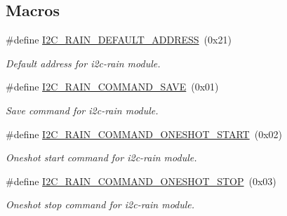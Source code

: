 \subsection*{Macros}
\begin{DoxyCompactItemize}
\item 
\mbox{\label{registers-rain_8h_a2aebb0ca4cdf424c57dee6f591c40e0c}} 
\#define \hyperlink{registers-rain_8h_a2aebb0ca4cdf424c57dee6f591c40e0c}{I2\+C\+\_\+\+R\+A\+I\+N\+\_\+\+D\+E\+F\+A\+U\+L\+T\+\_\+\+A\+D\+D\+R\+E\+SS}~(0x21)
\begin{DoxyCompactList}\small\item\em Default address for i2c-\/rain module. \end{DoxyCompactList}\item 
\mbox{\label{registers-rain_8h_a2317a1a8ab54f27bf55a2ddbbadeff89}} 
\#define \hyperlink{registers-rain_8h_a2317a1a8ab54f27bf55a2ddbbadeff89}{I2\+C\+\_\+\+R\+A\+I\+N\+\_\+\+C\+O\+M\+M\+A\+N\+D\+\_\+\+S\+A\+VE}~(0x01)
\begin{DoxyCompactList}\small\item\em Save command for i2c-\/rain module. \end{DoxyCompactList}\item 
\mbox{\label{registers-rain_8h_a6893d5ae3ff51fb2c425c0d214a68f23}} 
\#define \hyperlink{registers-rain_8h_a6893d5ae3ff51fb2c425c0d214a68f23}{I2\+C\+\_\+\+R\+A\+I\+N\+\_\+\+C\+O\+M\+M\+A\+N\+D\+\_\+\+O\+N\+E\+S\+H\+O\+T\+\_\+\+S\+T\+A\+RT}~(0x02)
\begin{DoxyCompactList}\small\item\em Oneshot start command for i2c-\/rain module. \end{DoxyCompactList}\item 
\mbox{\label{registers-rain_8h_a0127567ae86a5c8b5fe32c9db08fd5ef}} 
\#define \hyperlink{registers-rain_8h_a0127567ae86a5c8b5fe32c9db08fd5ef}{I2\+C\+\_\+\+R\+A\+I\+N\+\_\+\+C\+O\+M\+M\+A\+N\+D\+\_\+\+O\+N\+E\+S\+H\+O\+T\+\_\+\+S\+T\+OP}~(0x03)
\begin{DoxyCompactList}\small\item\em Oneshot stop command for i2c-\/rain module. \end{DoxyCompactList}\item 
\mbox{\label{registers-rain_8h_a7e69d765542130687c60f1009e2857ba}} 

\end{DoxyCompactItemize}
